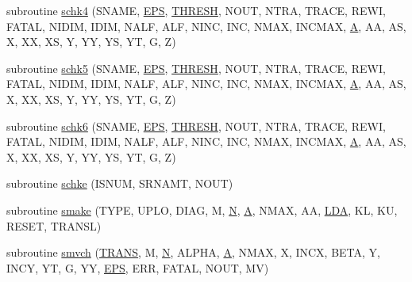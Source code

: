 \begin{DoxyCompactItemize}
\item 
subroutine \hyperlink{sblat2_8f_a5cf796f321f488cf07ad670b6a4a3044}{schk4} (S\+N\+A\+M\+E, \hyperlink{tukey_8c_a6ebf6899d6c1c8b7b9d09be872c05aae}{E\+P\+S}, \hyperlink{zlaqgs_8c_a0656018abfc9fa2821827415f5d5ea57}{T\+H\+R\+E\+S\+H}, N\+O\+U\+T, N\+T\+R\+A, T\+R\+A\+C\+E, R\+E\+W\+I, F\+A\+T\+A\+L, N\+I\+D\+I\+M, I\+D\+I\+M, N\+A\+L\+F, A\+L\+F, N\+I\+N\+C, I\+N\+C, N\+M\+A\+X, I\+N\+C\+M\+A\+X, \hyperlink{classA}{A}, A\+A, A\+S, X, X\+X, X\+S, Y, Y\+Y, Y\+S, Y\+T, G, Z)
\item 
subroutine \hyperlink{sblat2_8f_a431e8080232dbe8ab951e5a396f22b02}{schk5} (S\+N\+A\+M\+E, \hyperlink{tukey_8c_a6ebf6899d6c1c8b7b9d09be872c05aae}{E\+P\+S}, \hyperlink{zlaqgs_8c_a0656018abfc9fa2821827415f5d5ea57}{T\+H\+R\+E\+S\+H}, N\+O\+U\+T, N\+T\+R\+A, T\+R\+A\+C\+E, R\+E\+W\+I, F\+A\+T\+A\+L, N\+I\+D\+I\+M, I\+D\+I\+M, N\+A\+L\+F, A\+L\+F, N\+I\+N\+C, I\+N\+C, N\+M\+A\+X, I\+N\+C\+M\+A\+X, \hyperlink{classA}{A}, A\+A, A\+S, X, X\+X, X\+S, Y, Y\+Y, Y\+S, Y\+T, G, Z)
\item 
subroutine \hyperlink{sblat2_8f_a7d4da237e43a6bb49f245dee1fb1d996}{schk6} (S\+N\+A\+M\+E, \hyperlink{tukey_8c_a6ebf6899d6c1c8b7b9d09be872c05aae}{E\+P\+S}, \hyperlink{zlaqgs_8c_a0656018abfc9fa2821827415f5d5ea57}{T\+H\+R\+E\+S\+H}, N\+O\+U\+T, N\+T\+R\+A, T\+R\+A\+C\+E, R\+E\+W\+I, F\+A\+T\+A\+L, N\+I\+D\+I\+M, I\+D\+I\+M, N\+A\+L\+F, A\+L\+F, N\+I\+N\+C, I\+N\+C, N\+M\+A\+X, I\+N\+C\+M\+A\+X, \hyperlink{classA}{A}, A\+A, A\+S, X, X\+X, X\+S, Y, Y\+Y, Y\+S, Y\+T, G, Z)
\item 
subroutine \hyperlink{sblat2_8f_a1e23a9d74d4acf6f0a0c0944d653b213}{schke} (I\+S\+N\+U\+M, S\+R\+N\+A\+M\+T, N\+O\+U\+T)
\item 
subroutine \hyperlink{sblat2_8f_ab3dd038d965d574dd3a32935efd13747}{smake} (T\+Y\+P\+E, U\+P\+L\+O, D\+I\+A\+G, M, \hyperlink{polmisc_8c_a0240ac851181b84ac374872dc5434ee4}{N}, \hyperlink{classA}{A}, N\+M\+A\+X, A\+A, \hyperlink{example__user_8c_ae946da542ce0db94dced19b2ecefd1aa}{L\+D\+A}, K\+L, K\+U, R\+E\+S\+E\+T, T\+R\+A\+N\+S\+L)
\item 
subroutine \hyperlink{sblat2_8f_a32d78fc1870b445eb93c08d4faa9e1f5}{smvch} (\hyperlink{superlu__enum__consts_8h_a0c4e17b2d5cea33f9991ccc6a6678d62a1f61e3015bfe0f0c2c3fda4c5a0cdf58}{T\+R\+A\+N\+S}, M, \hyperlink{polmisc_8c_a0240ac851181b84ac374872dc5434ee4}{N}, A\+L\+P\+H\+A, \hyperlink{classA}{A}, N\+M\+A\+X, X, I\+N\+C\+X, B\+E\+T\+A, Y, I\+N\+C\+Y, Y\+T, G, Y\+Y, \hyperlink{tukey_8c_a6ebf6899d6c1c8b7b9d09be872c05aae}{E\+P\+S}, E\+R\+R, F\+A\+T\+A\+L, N\+O\+U\+T, M\+V)

\end{DoxyCompactItemize}
